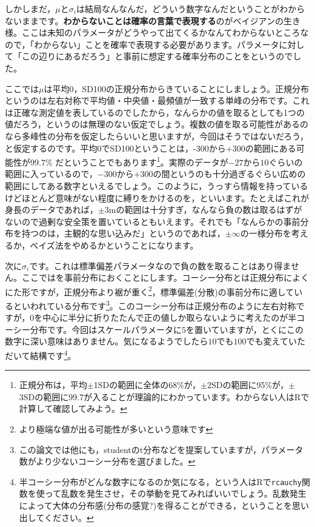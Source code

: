 \documentclass{ltjsbook}
\begin{document}
しかしまだ，$\mu$と$\sigma_i$は結局なんなんだ，どういう数字なんだということがわからないままです。\textbf{わからないことは確率の言葉で表現する}のがベイジアンの生き様。ここは未知のパラメータがどうやって出てくるかなんてわからないところなので，「わからない」ことを確率で表現する必要があります。パラメータに対して「この辺りにあるだろう」と事前に想定する確率分布のことをというのでした。

ここでは$\mu$は平均0，SD100の正規分布からきていることにしましょう。正規分布というのは左右対称で平均値・中央値・最頻値が一致する単峰の分布です。これは正確な測定値を表しているのでしたから，なんらかの値を取るとしても1つの値だろう，というのは無理のない仮定でしょう。複数の値を取る可能性があるのなら多峰性の分布を仮定したらいいと思いますが，今回はそうではないだろう，と仮定するのです。平均0でSD100ということは，-300から+300の範囲にある可能性が99.7\% だということでもあります\footnote{正規分布は，平均$\pm$1SDの範囲に全体の68\%が，$\pm$2SDの範囲に95\%が，$\pm$3SDの範囲に99.7が入ることが理論的にわかっています。わからない人はRで計算して確認してみよう。}。実際のデータが$-27$から$10$ぐらいの範囲に入っているので，$-300$から$+300$の間というのも十分過ぎるぐらい広めの範囲にしてある数字といえるでしょう。このように，うっすら情報を持っているけどほとんど意味がない程度に縛りをかけるのを，といいます。たとえばこれが身長のデータであれば，$\pm$3mの範囲は十分すぎ，なんなら負の数は取るはずがないので過剰な安全策を置いているともいえます。それでも「なんらかの事前分布を持つのは，主観的な思い込みだ」というのであれば，$\pm \infty$の一様分布を考えるか，ベイズ法をやめるかということになります。

次に$\sigma_i$です。これは標準偏差パラメータなので負の数を取ることはあり得ません。ここではを事前分布におくことにします。コーシー分布とは正規分布によくにた形ですが，正規分布より裾が重く\footnote{より極端な値が出る可能性が多いという意味です}，標準偏差(分散)の事前分布に適しているといわれている分布です\parencite{gelman2006prior}\footnote{この論文では他にも，studentのt分布などを提案していますが，パラメータ数がより少ないコーシー分布を選びました。}。このコーシー分布は正規分布のように左右対称ですが，0を中心に半分に折りたたんで正の値しか取らないように考えたのが半コーシー分布です。今回はスケールパラメータに$5$を置いていますが，とくにこの数字に深い意味はありません。気になるようでしたら$10$でも$100$でも変えていただいて結構です\footnote{半コーシー分布がどんな数字になるのか気になる，という人はRで\texttt{rcauchy}関数を使って乱数を発生させ，その挙動を見てみればいいでしょう。乱数発生によって大体の分布感(分布の感覚?)を得ることができる，ということを思い出してください。}。
\end{document}
